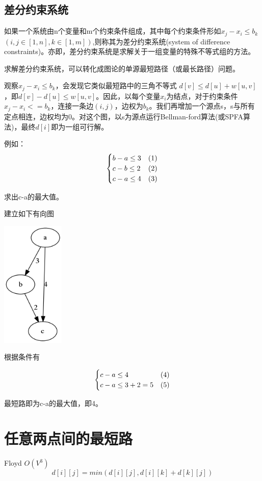 \documentclass[a4paper]{ctexrep}
\begin{document}
\subsection{差分约束系统}
如果一个系统由n个变量和m个约束条件组成，其中每个约束条件形如$x_j-x_i \le b_k$ $(i,j \in [1,n],k \in [1,m])$,则称其为差分约束系统(system of difference constraints)。亦即，差分约束系统是求解关于一组变量的特殊不等式组的方法。

求解差分约束系统，可以转化成图论的单源最短路径（或最长路径）问题。

观察$x_j-x_i \le b_k$，会发现它类似最短路中的三角不等式 $d[v] \le d[u]+w[u,v]$，即$d[v]-d[u] \le w[u,v]$。因此，以每个变量$x_i$为结点，对于约束条件$x_j-x_i<=b_k$，连接一条边$(i,j)$，边权为$b_k$。我们再增加一个源点s，s与所有定点相连，边权均为0。对这个图，以s为源点运行Bellman-ford算法(或SPFA算法)，最终${d[i]}$即为一组可行解。

例如：
$$
\begin{cases}
   b-a \le 3  & (1)\cr
   c-b \le 2  & (2)\cr
   c-a \le 4 & (3)\cr
\end{cases}
$$

求出c-a的最大值。

建立如下有向图
\begin{center}
	\includegraphics[width=3cm] {sodc.png}
\end{center}

根据条件有

$$
\begin{cases}
c-a \le 4 & (4)\cr
c-a \le 3+2 = 5 & (5) \cr
\end{cases}
$$

最短路即为c-a的最大值，即4。






\section{任意两点间的最短路}
Floyd $O(V^3)$
$$
d[i][j] = min(d[i][j], d[i][k] + d[k][j])
$$
\end{document}
